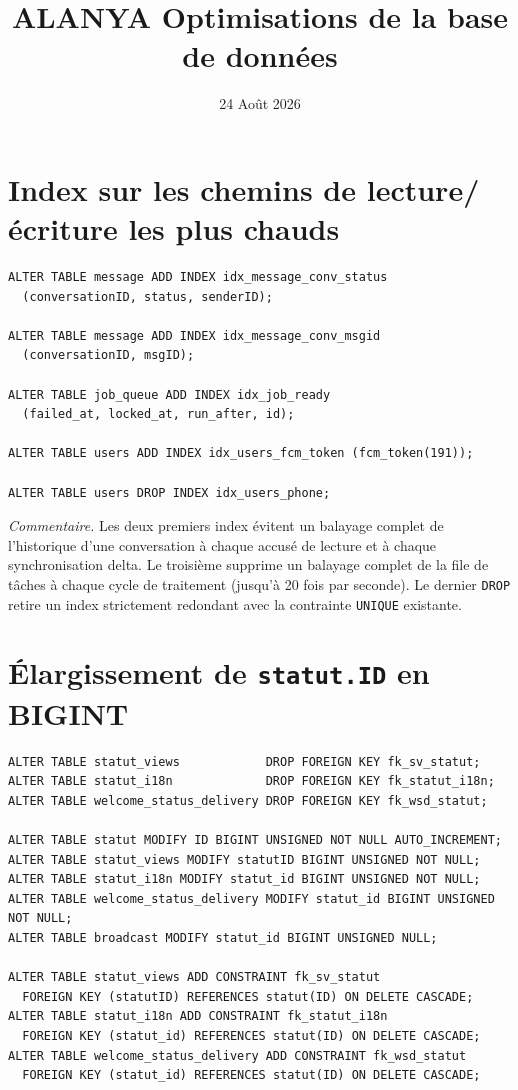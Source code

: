 \documentclass[a4paper,11pt]{article}
\title{\color{alanyaBlue}\textbf{ALANYA Optimisations de la base de données}\\}
\date{24 Août 2026}
\begin{document}
\maketitle
\thispagestyle{fancy} 
\section{Index sur les chemins de lecture/écriture les plus chauds}

\begin{lstlisting}
ALTER TABLE message ADD INDEX idx_message_conv_status
  (conversationID, status, senderID);

ALTER TABLE message ADD INDEX idx_message_conv_msgid
  (conversationID, msgID);

ALTER TABLE job_queue ADD INDEX idx_job_ready
  (failed_at, locked_at, run_after, id);

ALTER TABLE users ADD INDEX idx_users_fcm_token (fcm_token(191));

ALTER TABLE users DROP INDEX idx_users_phone;
\end{lstlisting}

\noindent\textit{Commentaire.} Les deux premiers index évitent un balayage complet de l'historique d'une conversation à chaque accusé de lecture et à chaque synchronisation delta. Le troisième supprime un balayage complet de la file de tâches à chaque cycle de traitement (jusqu'à 20 fois par seconde). Le dernier \texttt{DROP} retire un index strictement redondant avec la contrainte \texttt{UNIQUE} existante.
 

\section{Élargissement de \texttt{statut.ID} en BIGINT}

\begin{lstlisting}
ALTER TABLE statut_views            DROP FOREIGN KEY fk_sv_statut;
ALTER TABLE statut_i18n             DROP FOREIGN KEY fk_statut_i18n;
ALTER TABLE welcome_status_delivery DROP FOREIGN KEY fk_wsd_statut;

ALTER TABLE statut MODIFY ID BIGINT UNSIGNED NOT NULL AUTO_INCREMENT;
ALTER TABLE statut_views MODIFY statutID BIGINT UNSIGNED NOT NULL;
ALTER TABLE statut_i18n MODIFY statut_id BIGINT UNSIGNED NOT NULL;
ALTER TABLE welcome_status_delivery MODIFY statut_id BIGINT UNSIGNED NOT NULL;
ALTER TABLE broadcast MODIFY statut_id BIGINT UNSIGNED NULL;

ALTER TABLE statut_views ADD CONSTRAINT fk_sv_statut
  FOREIGN KEY (statutID) REFERENCES statut(ID) ON DELETE CASCADE;
ALTER TABLE statut_i18n ADD CONSTRAINT fk_statut_i18n
  FOREIGN KEY (statut_id) REFERENCES statut(ID) ON DELETE CASCADE;
ALTER TABLE welcome_status_delivery ADD CONSTRAINT fk_wsd_statut
  FOREIGN KEY (statut_id) REFERENCES statut(ID) ON DELETE CASCADE;
\end{lstlisting}
\end{document}
